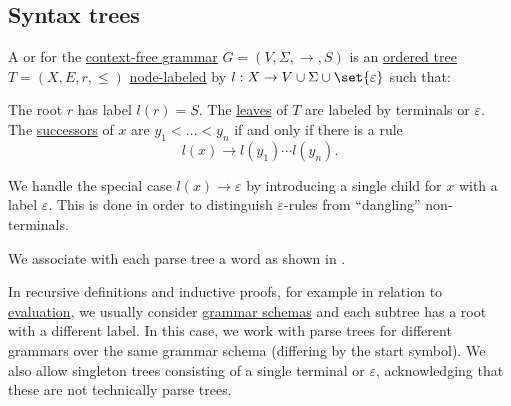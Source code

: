 \subsection{Syntax trees}\label{subsec:syntax_trees}

\begin{definition}\label{def:parse_tree}\mimprovised
  A  or  for the \hyperref[def:chomsky_hierarchy/context_free]{context-free grammar} \( G = (V, \Sigma, \to, S) \) is an \hyperref[def:ordered_tree]{ordered tree} \( T = (X, E, r, \leq) \) \hyperref[def:weighted_set]{node-labeled} by \( l: X \to V \cup \Sigma \cup \set{ \varepsilon } \) such that:
  \begin{thmenum}
     The root \( r \) has label \( l(r) = S \).
     The \hyperref[def:arborescence/ancestry]{leaves} of \( T \) are labeled by terminals or \( \varepsilon \).
     The \hyperref[def:arborescence/ancestry]{successors} of \( x \) are \( y_1 < \ldots < y_n \) if and only if there is a rule
    \begin{equation*}
      l(x) \to l(y_1) \cdots l(y_n).
    \end{equation*}

    We handle the special case \( l(x) \to \varepsilon \) by introducing a single child for \( x \) with a label \( \varepsilon \). This is done in order to distinguish \( \varepsilon \)-rules from \enquote{dangling} non-terminals.
  \end{thmenum}
\end{definition}
\begin{comments}
  \item We associate with each parse tree a word as shown in .
\end{comments}

\begin{remark}\label{rem:parse_tree_roots}
  In recursive definitions and inductive proofs, for example in relation to \hyperref[rem:evaluation]{evaluation}, we usually consider \hyperref[ex:natural_number_arithmetic_grammar/rules]{grammar schemas} and each subtree has a root with a different label. In this case, we work with parse trees for different grammars over the same grammar schema (differing by the start symbol). We also allow singleton trees consisting of a single terminal or \( \varepsilon \), acknowledging that these are not technically parse trees.
\end{remark}

